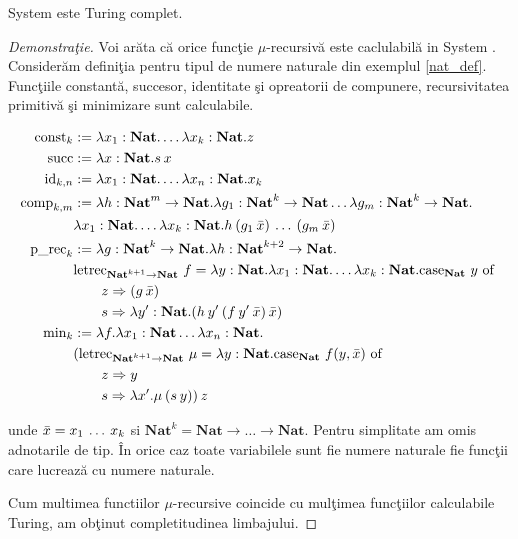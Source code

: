 \begin{theorem} \label{compl_sysfrec}
System \frec este Turing complet.
\end{theorem}\done{}
\begin{proof}[Demonstra\c tie]
Voi ar\u ata c\u a orice func\c tie $\mu$-recursiv\u a este caclulabil\u a in System \frec. Consider\u am defini\c tia pentru tipul de numere naturale din exemplul \ref{nat_def}. Func\c tiile constant\u a, succesor, identitate \c si opreatorii de compunere, recursivitatea primitiv\u a \c si minimizare sunt calculabile.

\begin{align*}
\text{const}_{k}  &:= \lambda x_1:{\textbf{Nat}}. \dots \lambda x_k:{\textbf{Nat}}. z \\
\text{succ}         &:= \lambda x:{\textbf{Nat}} . s\hspace{2pt} x\\
\text{id}_{k,n}     &:= \lambda x_1:{\textbf{Nat}}. \dots \lambda x_n:{\textbf{Nat}}.x_k \\
\text{comp}_{k,m}   &:= \lambda h: \textbf{Nat}^{m} \to \textbf{Nat}. \lambda g_1: \textbf{Nat}^{k} \to \textbf{Nat} \dots \lambda g_m:\textbf{Nat}^{k} \to \textbf{Nat}. \\
                    & \lambda x_1:\textbf{Nat}. \dots \lambda x_k:\textbf{Nat}. h \hspace{2pt} (g_1\hspace{2pt} \bar{x} )\hspace{2pt} \dots \hspace{2pt} (g_m\hspace{2pt} \bar{x}) \\
\text{p\_rec}_k     &:= \lambda g:\textbf{Nat}^{k} \to \textbf{Nat}. \lambda h:\textbf{Nat}^{k+2} \to \textbf{Nat}.\\
                    & \text{letrec}_{\textbf{Nat}^{k+1} \to \textbf{Nat}} \ f =\lambda y:\textbf{Nat}.\lambda x_1:\textbf{Nat}. \dots \lambda x_k:\textbf{Nat}. \text{case}_{\textbf{Nat}}\ y \text{ of } \\
                    & \qquad z \Rightarrow (g\hspace{2pt} \bar{x}) \\
                    & \qquad s \Rightarrow \lambda y' : \textbf{Nat}. (h\hspace{2pt} y'\hspace{2pt} (f\hspace{2pt} y'\hspace{2pt} \bar{x})\hspace{2pt} \bar{x})\\
\text{min}_k        &:= \lambda f. \lambda x_1:\textbf{Nat} \dots \lambda x_n:\textbf{Nat}. \\
                    & (\text{letrec}_{\textbf{Nat}^{k+1} \to \textbf{Nat}}\  \mu = \lambda y:\textbf{Nat}. \text{case}_{\textbf{Nat}}\  f(y, \bar{x}) \text{ of } \\
                    & \qquad z \Rightarrow y \\
                    & \qquad s \Rightarrow \lambda x' .  \mu\hspace{2pt} (s\hspace{2pt} y))\hspace{2pt} z
\end{align*}


unde $\bar{x} = x_1\hspace{2pt} \dots\hspace{2pt} x_k$ si $\textbf{Nat}^k = \textbf{Nat}\to\dots\to\textbf{Nat}$. Pentru simplitate am omis adnotarile de tip. \^ In orice caz toate variabilele sunt fie numere naturale fie func\c tii care lucreaz\u a cu numere naturale.

Cum multimea functiilor $\mu$-recursive coincide cu mul\c timea func\c tiilor calculabile Turing, am ob\c tinut completitudinea limbajului.
\end{proof}
